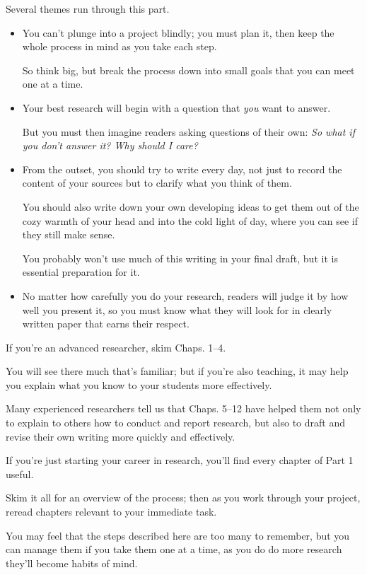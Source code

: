 \documentclass[oneside]{book}
\numberwithin{equation}{section}
\begin{document}
%
Several themes run through this part.
\begin{itemize}
    \item You can't plunge into a project blindly; you must plan it, then keep the whole process in mind as you take each step.
    
    So think big, but break the process down into small goals that you can meet one at a time.
    \item Your best research will begin with a question that \textit{you} want to answer.
    
    But you must then imagine readers asking questions of their own: \textit{So what if you don't answer it? Why should I care?}
    \item From the outset, you should try to write every day, not just to record the content of your sources but to clarify what you think of them.
    
    You should also write down your own developing ideas to get them out of the cozy warmth of your head and into the cold light of day, where you can see if they still make sense.
    
    You probably won't use much of this writing in your final draft, but it is essential preparation for it.
    \item No matter how carefully you do your research, readers will judge it by how well you present it, so you must know what they will look for in clearly written paper that earns their respect.
\end{itemize}
%
If you're an advanced researcher, skim Chaps. 1--4.

You will see there much that's familiar; but if you're also teaching, it may help you explain what you know to your students more effectively.

Many experienced researchers tell us that Chaps. 5--12 have helped them not only to explain to others how to conduct and report research, but also to draft and revise their own writing more quickly and effectively.

%
If you're just starting your career in research, you'll find every chapter of Part 1 useful.

Skim it all for an overview of the process; then as you work through your project, reread chapters relevant to your immediate task.

%
You may feel that the steps described here are too many to remember, but you can manage them if you take them one at a time, as you do do more research they'll become habits of mind.
\end{document}
